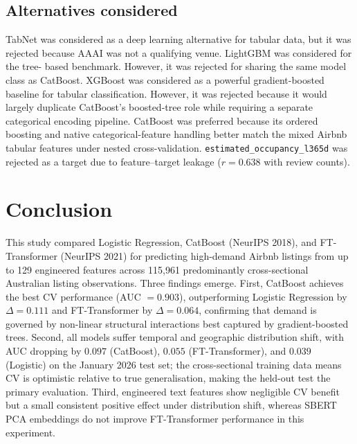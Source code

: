 \documentclass[10pt,a4paper]{article}
\begin{document}
\subsection{Alternatives considered}
TabNet \cite{arik2021} was considered as a deep learning alternative for tabular data, but it 
was rejected because AAAI was not a qualifying venue. LightGBM was considered for the tree-
based benchmark. However, it was rejected for sharing the same model class as CatBoost. 
XGBoost was considered as a powerful gradient-boosted baseline for tabular classification.
However, it was rejected because it would largely duplicate CatBoost's boosted-tree
role while requiring a separate categorical encoding pipeline. CatBoost was preferred
because its ordered boosting and native categorical-feature handling better match the
mixed Airbnb tabular features under nested cross-validation.
\texttt{estimated\_occupancy\_l365d} was rejected as a target due to
feature--target leakage ($r = 0.638$ with review counts).
\section{Conclusion}

This study compared Logistic Regression, CatBoost (NeurIPS 2018), and
FT-Transformer (NeurIPS 2021) for predicting high-demand Airbnb listings from
up to 129 engineered features across 115{,}961 predominantly cross-sectional
Australian listing observations. Three findings emerge. First, CatBoost achieves the best CV performance
(AUC $= 0.903$), outperforming Logistic Regression by $\Delta = 0.111$ and
FT-Transformer by $\Delta = 0.064$, confirming that demand is governed by
non-linear structural interactions best captured by gradient-boosted trees.
Second, all models suffer temporal and geographic distribution shift, with AUC
dropping by $0.097$ (CatBoost), $0.055$ (FT-Transformer), and $0.039$ (Logistic)
on the January 2026 test set; the cross-sectional training data means CV is
optimistic relative to true generalisation, making the held-out test the primary
evaluation. Third, engineered text features show negligible CV benefit but a
small consistent positive effect under distribution shift, whereas SBERT PCA
embeddings do not improve FT-Transformer performance in this experiment.
\end{document}
